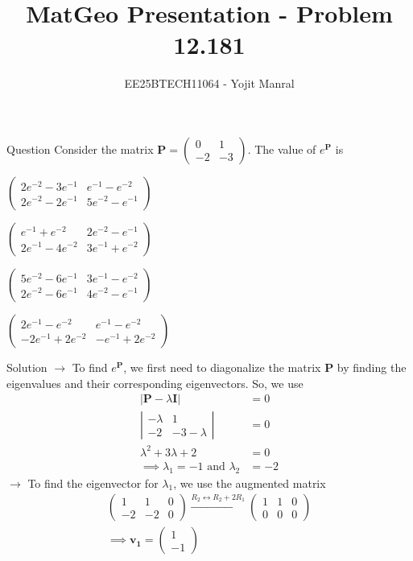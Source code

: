 \documentclass{beamer}
\title{MatGeo Presentation - Problem 12.181}
\author{EE25BTECH11064 - Yojit Manral}
\date{}
\numberwithin{equation}{section}
\theoremstyle{remark}
\newcommand{\myvec}[1]{\ensuremath{\begin{pmatrix}#1\end{pmatrix}}}
\let\vec\mathbf
\begin{document}
\frame{\titlepage}
\begin{frame}{Question}
Consider the matrix $\vec{P} = \myvec{0&1\\-2&-3}$. The value of $e^{\vec{P}}$ is
\begin{enumerate}[label=(\alph*)]
\begin{multicols}{2}
    \item $\myvec{2e^{-2}-3e^{-1}&e^{-1}-e^{-2}\\2e^{-2}-2e^{-1}&5e^{-2}-e^{-1}}$
    \item $\myvec{e^{-1}+e^{-2}&2e^{-2}-e^{-1}\\2e^{-1}-4e^{-2}&3e^{-1}+e^{-2}}$
    \item $\myvec{5e^{-2}-6e^{-1}&3e^{-1}-e^{-2}\\2e^{-2}-6e^{-1}&4e^{-2}-e^{-1}}$
    \item $\myvec{2e^{-1}-e^{-2}&e^{-1}-e^{-2}\\-2e^{-1}+2e^{-2}&-e^{-1}+2e^{-2}}$
\end{multicols}
\end{enumerate}
\end{frame}

\begin{frame}{Solution}
$\rightarrow$ To find $e^{\vec{P}}$, we first need to diagonalize the matrix $\vec{P}$ by finding the eigenvalues and their corresponding eigenvectors. So, we use
\begin{align}
    |\vec{P} - \lambda\vec{I}| &= 0 \\
    \left|\begin{array}{cc}-\lambda&1\\-2&-3-\lambda\end{array}\right| &= 0 \\
    \lambda^2 + 3\lambda + 2 &= 0 \\
    \implies \lambda_1 = -1\text{ and }\lambda_2 &= -2
\end{align}
$\rightarrow$ To find the eigenvector for $\lambda_1$, we use the augmented matrix
\begin{align}
    \left(\begin{array}{cc|c}1&1&0\\-2&-2&0\end{array}\right) \xrightarrow{R_2 \leftrightarrow R_2 + 2R_1} \left(\begin{array}{cc|c}1&1&0\\0&0&0\end{array}\right) \\
    \implies \vec{v_1} = \myvec{1\\-1}
\end{align}
\end{frame}
\end{document}
